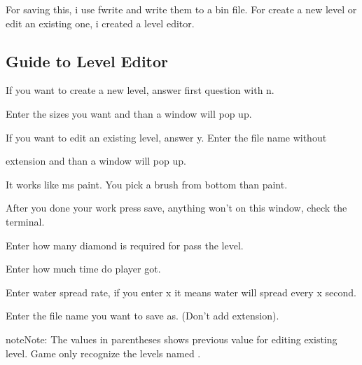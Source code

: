 \documentclass[letterpaper,10pt,english]{sphinxmanual}
\begin{document}
For saving this, i use fwrite and write them to a bin file. For create a new level
or edit an existing one, i created a level editor.


\subsection{Guide to Level Editor}
\label{\detokenize{level:guide-to-level-editor}}
\begin{DUlineblock}{0em}
\item[] If you want to create a new level, answer first question with n.
\item[] Enter the sizes you want and than a window will pop up.
\item[] 
\item[] If you want to edit an existing level, answer y. Enter the file name without 
\item[] extension and than a window will pop up.
\item[] 
\item[] It works like ms paint. You pick a brush from bottom than paint.
\item[] After you done your work press save, anything won’t on this window, check the terminal.
\item[] Enter how many diamond is required for pass the level.
\item[] Enter how much time do player got.
\item[] Enter water spread rate, if you enter x it means water will spread every x second.
\item[] Enter the file name you want to save as. (Don’t add extension).
\end{DUlineblock}

\begin{sphinxadmonition}{note}{Note:}
The values in parentheses shows previous value for editing existing level.
Game only recognize the levels named .
\end{sphinxadmonition}



\renewcommand{\indexname}{Index}
\printindex
\end{document}
